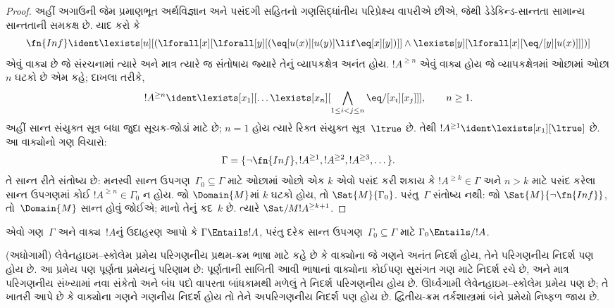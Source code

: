 \begin{proof}
અહીં અગાઉની જેમ પ્રમાણભૂત અર્થવિજ્ઞાન અને પસંદગી સહિતનો
ગણસિદ્ધાંતીય પરિપ્રેક્ષ્ય વાપરીએ છીએ, જેથી ડેડેકિન્ડ-સાન્તતા
સામાન્ય સાન્તતાની સમકક્ષ છે.
યાદ કરો કે
\[
\fn{Inf} \ident \lexists[u][(\lforall[x][\lforall[y][(\eq[u(x)][u(y)]
      \lif \eq[x][y])]] \land \lexists[y][\lforall[x][\eq/[y][u(x)]]])]
\]
એવું વાક્ય છે જે સંરચનામાં ત્યારે અને માત્ર ત્યારે જ
સંતોષાય જ્યારે તેનું વ્યાપકક્ષેત્ર અનંત હોય. $!A^{\ge n}$ એવું
વાક્ય હોય જે વ્યાપકક્ષેત્રમાં ઓછામાં ઓછા $n$ ઘટકો છે એમ કહે;
દાખલા તરીકે,
\[
!A^{\ge n} \ident \lexists[x_1][\dots\lexists[x_n][
  \bigwedge_{1\le i<j\le n}\eq/[x_i][x_j]]], \qquad n\ge1.
\]
અહીં સાન્ત સંયુક્ત સૂત્ર બધા જુદા સૂચક-જોડાં માટે છે; $n=1$
હોય ત્યારે રિક્ત સંયુક્ત સૂત્ર~$\ltrue$ છે. તેથી
$!A^{\ge1}\ident\lexists[x_1][\ltrue]$ છે.
આ વાક્યોનો ગણ વિચારો:
\[
\Gamma = \{\lnot \fn{Inf}, !A^{\ge 1}, !A^{\ge 2}, !A^{\ge 3}, \dots\}.
\]
તે સાન્ત રીતે સંતોષ્ય છે: મનસ્વી સાન્ત ઉપગણ~$\Gamma_0
\subseteq \Gamma$ માટે ઓછામાં ઓછો એક $k$ એવો પસંદ કરી શકાય કે
$!A^{\ge k} \in \Gamma$ અને $n>k$ માટે પસંદ કરેલા સાન્ત ઉપગણમાં
કોઈ $!A^{\ge n}
\in \Gamma_0$ ન હોય. જો $\Domain{M}$માં $k$ ઘટકો હોય,
તો $\Sat{M}{\Gamma_0}$. પરંતુ~$\Gamma$ સંતોષ્ય નથી: જો
$\Sat{M}{\lnot \fn{Inf}}$, તો~$\Domain{M}$ સાન્ત હોવું જોઈએ;
માનો તેનું કદ~$k$ છે. ત્યારે $\Sat/{M}{!A^{\ge k+1}}$.
\end{proof}

\begin{prob}
એવો ગણ~$\Gamma$ અને વાક્ય~$!A$નું ઉદાહરણ આપો કે
$\Gamma \Entails !A$, પરંતુ દરેક સાન્ત ઉપગણ~$\Gamma_0 \subseteq
\Gamma$ માટે $\Gamma_0 \Entails/ !A$.
\end{prob}
\endgroup


\begingroup
\makeatletter{}\makeatother


\label{guunit:OLP-0335}


\begin{explain}
(અધોગામી) લેવેનહાઇમ--સ્કોલેમ પ્રમેય પરિગણનીય પ્રથમ-ક્રમ ભાષા
માટે કહે છે કે વાક્યોના જે
ગણને અનંત નિદર્શ હોય, તેને પરિગણનીય નિદર્શ પણ હોય છે. આ
પ્રમેય પણ પૂર્ણતા પ્રમેયનું પરિણામ છે: પૂર્ણતાની સાબિતી
આવી ભાષાનાં વાક્યોના કોઈપણ સુસંગત ગણ માટે નિદર્શ રચે છે,
અને માત્ર પરિગણનીય સંખ્યામાં નવા સંકેતો અને બંધ પદો વાપરતા
બાંધકામથી મળેલું તે નિદર્શ પરિગણનીય હોય છે.
ઊર્ધ્વગામી લેવેનહાઇમ--સ્કોલેમ પ્રમેય પણ છે;
તે ખાતરી આપે છે કે વાક્યોના ગણને ગણનીય નિદર્શ
હોય તો તેને અપરિગણનીય નિદર્શ પણ હોય છે. દ્વિતીય-ક્રમ
તર્કશાસ્ત્રમાં બંને પ્રમેયો નિષ્ફળ જાય છે.
\end{explain}


